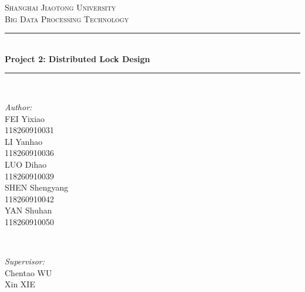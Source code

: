 \documentclass[10pt]{article}
\begin{document}
\begin{titlepage}

\newcommand{\HRule}{\rule{\linewidth}{0.5mm}} %

\center %


\textsc{\LARGE Shanghai Jiaotong University}\\[1.5cm] %
\textsc{\Large Big Data Processing Technology}\\[0.5cm] %


\HRule \\[0.4cm]
{ \huge \bfseries Project 2: Distributed Lock Design}\\[0.4cm] %
\HRule \\[1.5cm]


\begin{minipage}{0.4\textwidth}
\begin{flushleft} \large
\emph{Author:}\\
FEI Yixiao \\118260910031\\
LI Yanhao \\118260910036\\
LUO Dihao \\118260910039\\ %
SHEN Shengyang \\118260910042\\
YAN Shuhan \\118260910050\\ %
\end{flushleft}
\end{minipage}
~
\begin{minipage}{0.4\textwidth}
\begin{flushright} \large
\emph{Supervisor:} \\
Chentao  \textsc{WU} \\%
Xin  \textsc{XIE}
\end{flushright}
\end{minipage}\\[2cm]


\end{titlepage}
\end{document}
